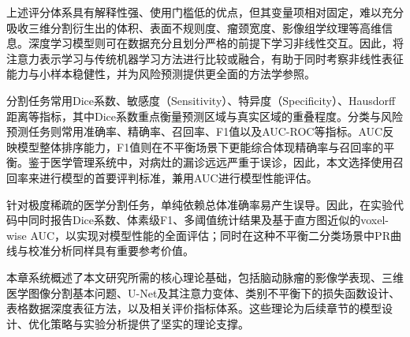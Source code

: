 上述评分体系具有解释性强、使用门槛低的优点，但其变量项相对固定，难以充分吸收三维分割衍生出的体积、表面不规则度、瘤颈宽度、影像组学纹理等高维信息。深度学习模型则可在数据充分且划分严格的前提下学习非线性交互。因此，将注意力表示学习与传统机器学习方法进行比较或融合，有助于同时考察非线性表征能力与小样本稳健性，并为风险预测提供更全面的方法学参照。


分割任务常用Dice系数、敏感度（Sensitivity）、特异度（Specificity）、Hausdorff距离等指标，其中Dice系数重点衡量预测区域与真实区域的重叠程度。分类与风险预测任务则常用准确率、精确率、召回率、F1值以及AUC-ROC等指标。AUC反映模型整体排序能力，F1值则在不平衡场景下更能综合体现精确率与召回率的平衡。鉴于医学管理系统中，对病灶的漏诊远远严重于误诊，因此，本文选择使用召回率来进行模型的首要评判标准，兼用AUC进行模型性能评估。

针对极度稀疏的医学分割任务，单纯依赖总体准确率易产生误导。因此，在实验代码中同时报告Dice系数、体素级F1、多阈值统计结果及基于直方图近似的voxel-wise AUC，以实现对模型性能的全面评估；同时在这种不平衡二分类场景中PR曲线与校准分析同样具有重要参考价值\cite{saito2015pr,guo2017calibration,niculescumizil2005calibration,chicco2020f1}。


本章系统概述了本文研究所需的核心理论基础，包括脑动脉瘤的影像学表现、三维医学图像分割基本问题、U-Net及其注意力变体、类别不平衡下的损失函数设计、表格数据深度表征方法，以及相关评价指标体系。这些理论为后续章节的模型设计、优化策略与实验分析提供了坚实的理论支撑。

